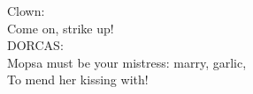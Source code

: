 Clown:\\
Come on, strike up!\\
DORCAS:\\
Mopsa must be your mistress: marry, garlic,\\
To mend her kissing with!
